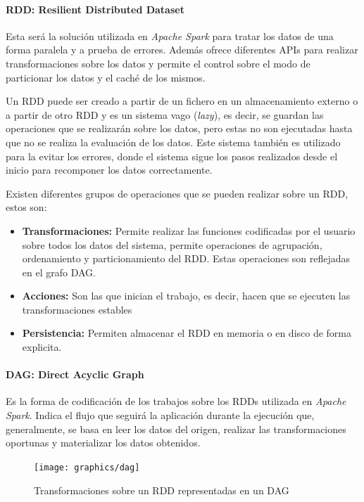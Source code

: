 \paragraph{\gls{RDD}: Resilient Distributed Dataset}
Esta será la solución utilizada en \textit{Apache Spark} para tratar los datos de una forma paralela y a prueba de errores. Además ofrece diferentes \gls{API}s para realizar transformaciones sobre los datos y permite el control sobre el modo de particionar los datos y el caché de los mismos.

Un \gls{RDD} puede ser creado a partir de un fichero en un almacenamiento externo o a partir de otro \gls{RDD} y es un sistema vago (\textit{lazy}), es decir, se guardan las operaciones que se realizarán sobre los datos, pero estas no son ejecutadas hasta que no se realiza la evaluación de los datos. Este sistema también es utilizado para la evitar los errores, donde el sistema sigue los pasos realizados desde el inicio para recomponer los datos correctamente.

Existen diferentes grupos de operaciones que se pueden realizar sobre un \gls{RDD}, estos son:

\begin{itemize}
\item \textbf{Transformaciones:} Permite realizar las funciones codificadas por el usuario sobre todos los datos del sistema, permite operaciones de agrupación, ordenamiento y particionamiento del \gls{RDD}. Estas operaciones son reflejadas en el grafo \gls{DAG}.

\item \textbf{Acciones:} Son las que inician el trabajo, es decir, hacen que se ejecuten las transformaciones estables

\item \textbf{Persistencia:} Permiten almacenar el \gls{RDD} en memoria o en disco de forma explicita.
\end{itemize}

\paragraph{\gls{DAG}: Direct Acyclic Graph} 
Es la forma de codificación de los trabajos sobre los \gls{RDD}s utilizada en \textit{Apache Spark}. Indica el flujo que seguirá la aplicación durante la ejecución que, generalmente, se basa en leer los datos del origen, realizar las transformaciones oportunas y materializar los datos obtenidos.

\begin{figure}[htp!]
	\centering
	\caption{Transformaciones sobre un \gls{RDD} representadas en un \gls{DAG} \cite{partsSpark}}
	\label{dag}
	\vspace{5pt}
	\texttt{[image: graphics/dag]}
\end{figure}

